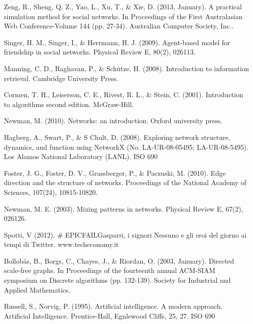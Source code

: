 \documentclass[a4paper,12pt]{article}
\begin{document}
\begin{thebibliography}{9}
  Zeng, R., Sheng, Q. Z., Yao, L., Xu, T., \& Xie, D. (2013, January). A practical simulation method for social networks. In Proceedings of the First Australasian Web Conference-Volume 144 (pp. 27-34). Australian Computer Society, Inc..
  
  Singer, H. M., Singer, I., \& Herrmann, H. J. (2009). Agent-based model for friendship in social networks. Physical Review E, 80(2), 026113.

  Manning, C. D., Raghavan, P., \& Schütze, H. (2008). Introduction to information retrieval. Cambridge University Press.
  
  Cormen, T. H., Leiserson, C. E., Rivest, R. L., \& Stein, C. (2001). Introduction to algorithms second edition. McGraw-Hill.
  
  Newman, M. (2010). Networks: an introduction. Oxford university press.
  
  Hagberg, A., Swart, P., \& S Chult, D. (2008). Exploring network structure, dynamics, and function using NetworkX (No. LA-UR-08-05495; LA-UR-08-5495). Los Alamos National Laboratory (LANL).
ISO 690	

  Foster, J. G., Foster, D. V., Grassberger, P., \& Paczuski, M. (2010). Edge direction and the structure of networks. Proceedings of the National Academy of Sciences, 107(24), 10815-10820.
  
  Newman, M. E. (2003). Mixing patterns in networks. Physical Review E, 67(2), 026126.
  
  Spotti, V (2012). \# EPICFAILGasparri, i signori Nessuno e gli eroi del giorno ai tempi di Twitter. www.techeconomy.it
  
  Bollobás, B., Borgs, C., Chayes, J., \& Riordan, O. (2003, January). Directed scale-free graphs. In Proceedings of the fourteenth annual ACM-SIAM symposium on Discrete algorithms (pp. 132-139). Society for Industrial and Applied Mathematics.
  
  Russell, S., Norvig, P. (1995).  Artificial intelligence. A modern approach. Artificial Intelligence. Prentice-Hall, Egnlewood Cliffs, 25, 27.
ISO 690	

\end{thebibliography}
\end{document}
